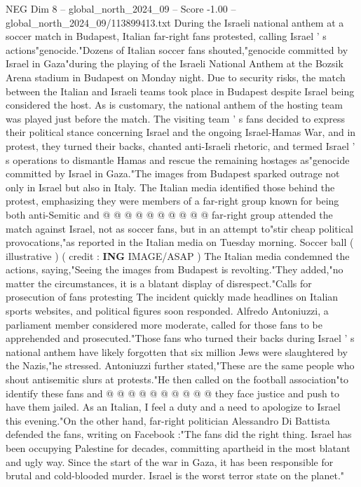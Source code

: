 \begin{textsample}{NEG Dim 8 – global\_north\_2024\_09 – Score -1.00 – global\_north\_2024\_09/113899413.txt}  \label{ex:f8_neg_155}
During the Israeli national anthem at a soccer match in Budapest, Italian far-right fans protested, calling Israel ' s actions"genocide."Dozens of Italian soccer fans shouted,"genocide committed by Israel in Gaza"during the playing of the Israeli National Anthem at the Bozsik Arena stadium in Budapest on Monday night.
Due to security risks, the match between the Italian and Israeli teams took place in Budapest despite Israel being considered the host.
As is customary, the national anthem of the hosting team was played just before the match.
The visiting team ' s fans decided to express their political stance concerning Israel and the ongoing Israel-Hamas War, and in protest, they turned their backs, chanted anti-Israeli rhetoric, and termed Israel ' s operations to dismantle Hamas and rescue the remaining hostages as"genocide committed by Israel in Gaza."The images from Budapest sparked outrage not only in Israel but also in Italy.
The Italian media identified those behind the protest, emphasizing they were members of a far-right group known for being both anti-Semitic and @ @ @ @ @ @ @ @ @ @ far-right group attended the match against Israel, not as soccer fans, but in an attempt to"stir cheap political provocations,"as reported in the Italian media on Tuesday morning.
Soccer ball ( illustrative ) ( credit : \textbf{ING} IMAGE/ASAP ) The Italian media condemned the actions, saying,"Seeing the images from Budapest is revolting."They added,"no matter the circumstances, it is a blatant display of disrespect."Calls for prosecution of fans protesting The incident quickly made headlines on Italian sports websites, and political figures soon responded.
Alfredo Antoniuzzi, a parliament member considered more moderate, called for those fans to be apprehended and prosecuted."Those fans who turned their backs during Israel ' s national anthem have likely forgotten that six million Jews were slaughtered by the Nazis,"he stressed.
Antoniuzzi further stated,"These are the same people who shout antisemitic slurs at protests."He then called on the football association"to identify these fans and @ @ @ @ @ @ @ @ @ @ they face justice and push to have them jailed.
As an Italian, I feel a duty and a need to apologize to Israel this evening."On the other hand, far-right politician Alessandro Di Battista defended the fans, writing on Facebook :"The fans did the right thing.
Israel has been occupying Palestine for decades, committing apartheid in the most blatant and ugly way.
Since the start of the war in Gaza, it has been responsible for brutal and cold-blooded murder.
Israel is the worst terror state on the planet."

\end{textsample}
